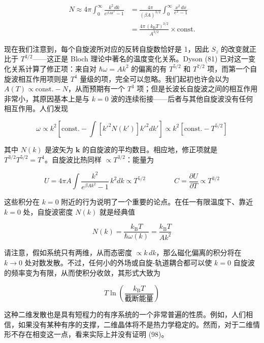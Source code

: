 \begin{align*}
N \approx 4\pi\int_{0}^{\infty} \frac{k^{2}\,dk}{e^{\beta Ak^{2}} - 1} &= \frac{4\pi}{(\beta A)^{3/2}}\int_{0}^{\infty} \frac{x^{2}\,dx}{e^{x} - 1} \\
&= \frac{4\pi\,(k_{\mathrm{B}}T)^{3/2}}{A^{3/2}} \times \text{const.}
\end{align*}

现在我们注意到，每个自旋波所对应的反转自旋数恰好是 1，因此 $S_{z}$ 的改变就正比于 $T^{3/2}$——这正是 Bloch 理论中著名的温度变化关系。Dyson (81) 已对这一变化关系计算了修正项：来自对 $\hbar\omega = Ak^{2}$ 的偏离的有 $T^{5/2}$ 和 $T^{7/2}$ 项，而第一个自旋波相互作用项则是 $T^{4}$ 量级的项，完全可以忽略。我们起初也许会以为 $A(T) \propto \text{const.} - N$，从而预期有一个 $T^{3}$ 项；但是长波长自旋波之间的相互作用非常小，其原因基本上是与 $k=0$ 波的连续衔接——后者与其他自旋波没有任何相互作用。人们发现

\begin{equation*}
\omega \propto k^{2}\left[\text{const.} - \int \left[k'^{2}N(k')\right] k'^{2}dk'\right] \propto k^{2}\left[\text{const.} - T^{5/2}\right]
\end{equation*}

其中 $N(k)$ 是波矢为 $\mathbf{k}$ 的自旋波的平均数目。相应地，修正项就是 $T^{3/2}T^{5/2} = T^{4}$。自旋波比热同样 $\propto T^{3/2}$：能量为

\begin{equation*}
U = 4\pi A\int \frac{k^{2}}{e^{\beta Ak^{2}} - 1}\, k^{2}dk \propto T^{5/2} \qquad\qquad C = \frac{\partial U}{\partial T} \propto T^{3/2}
\end{equation*}

这些积分在 $k=0$ 附近的行为说明了一个重要的论点。在任一有限温度下、靠近 $k=0$ 处，自旋波密度 $N(k)$ 就是经典值

\begin{equation*}
N(k) = \frac{k_{\mathrm{B}}T}{\hbar\omega(k)} = \frac{k_{\mathrm{B}}T}{Ak^{2}}
\end{equation*}

请注意，假如系统只有两维，从而态密度 $\propto k\,dk$，那么磁化偏离的积分将在 $k \rightarrow 0$ 处对数发散。不过，任何小的外场或自旋-轨道耦合都可以使 $k=0$ 自旋波的频率变为有限，从而使积分收敛，其形式大致为

\begin{equation*}
T\ln\left(\frac{k_{\mathrm{B}}T}{\text{截断能量}}\right)
\end{equation*}

这种二维发散也是具有短程力的有序系统的一个非常普遍的性质。例如，人们相信，如果没有某种有序的支撑，二维晶体将不是热力学稳定的。然而，对于二维情形不存在相变这一点，看来实际上并没有证明 (98)。


